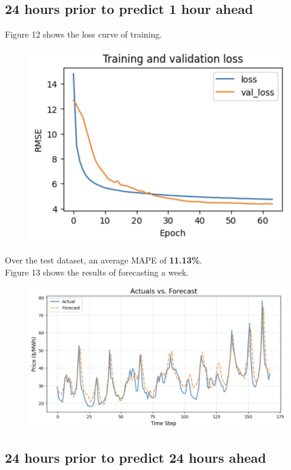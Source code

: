 \documentclass[9pt,a4paper,twoside]{rho}
\begin{document}
\subsection*{24 hours prior to predict 1 hour ahead}

\noindent Figure 12 shows the loss curve of training.
\begin{figure}[H]
	\centering
	\includegraphics[width=0.8\columnwidth]{Figures/CNN_24_1_Learning.png}
\end{figure}

\noindent Over the test dataset, an average MAPE of \textbf{11.13\%}.\\

\noindent Figure 13 shows the results of forecasting a week.
\begin{figure}[H]
	\centering
	\includegraphics[width=0.8\columnwidth]{Figures/CNN_24_1_Results.png}
\end{figure}

\subsection*{24 hours prior to predict 24 hours ahead}
\end{document}
